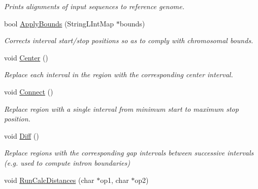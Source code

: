 \begin{DoxyCompactItemize}
\begin{DoxyCompactList}\small\item\em Prints alignments of input sequences to reference genome. \end{DoxyCompactList}\item 
\hypertarget{classGenomicRegionSAM_a7315b920fcc6ef84f1ecaee5f842fa82}{
bool \hyperlink{classGenomicRegionSAM_a7315b920fcc6ef84f1ecaee5f842fa82}{ApplyBounds} (StringLIntMap $\ast$bounds)}
\label{classGenomicRegionSAM_a7315b920fcc6ef84f1ecaee5f842fa82}

\begin{DoxyCompactList}\small\item\em Corrects interval start/stop positions so as to comply with chromosomal bounds. \end{DoxyCompactList}\item 
\hypertarget{classGenomicRegionSAM_a52fa8c0420b16fe92f54427365f72899}{
void \hyperlink{classGenomicRegionSAM_a52fa8c0420b16fe92f54427365f72899}{Center} ()}
\label{classGenomicRegionSAM_a52fa8c0420b16fe92f54427365f72899}

\begin{DoxyCompactList}\small\item\em Replace each interval in the region with the corresponding center interval. \end{DoxyCompactList}\item 
\hypertarget{classGenomicRegionSAM_ad765c84814151be0e710fefb37c7949a}{
void \hyperlink{classGenomicRegionSAM_ad765c84814151be0e710fefb37c7949a}{Connect} ()}
\label{classGenomicRegionSAM_ad765c84814151be0e710fefb37c7949a}

\begin{DoxyCompactList}\small\item\em Replace region with a single interval from minimum start to maximum stop position. \end{DoxyCompactList}\item 
\hypertarget{classGenomicRegionSAM_aca38b04fa916ae4c9c28c36f537136ba}{
void \hyperlink{classGenomicRegionSAM_aca38b04fa916ae4c9c28c36f537136ba}{Diff} ()}
\label{classGenomicRegionSAM_aca38b04fa916ae4c9c28c36f537136ba}

\begin{DoxyCompactList}\small\item\em Replace regions with the corresponding gap intervals between successive intervals (e.g. used to compute intron boundaries) \end{DoxyCompactList}\item 
\hypertarget{classGenomicRegionSAM_afc9c7ec17be517dd5b1ad7cb62f58826}{
void \hyperlink{classGenomicRegionSAM_afc9c7ec17be517dd5b1ad7cb62f58826}{RunCalcDistances} (char $\ast$op1, char $\ast$op2)}
\label{classGenomicRegionSAM_afc9c7ec17be517dd5b1ad7cb62f58826}


\end{DoxyCompactItemize}
